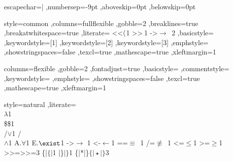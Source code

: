 


  {escapechar=|
  ,numbersep=-9pt %
  ,aboveskip=0pt
  ,belowskip=0pt
  }

  {style=common
  ,columns=fullflexible
  ,gobble=2
  ,breaklines=true
  ,breakatwhitespace=true
  ,literate=
    {<<}{{$\langle$}}1
    {>>}{{$\>$}}1
    {->}{{$\to$\ }}2
  ,basicstyle={\sffamily}
  ,keywordstyle=[1]{\bfseries}
  ,keywordstyle=[2]{\scshape}
  ,keywordstyle=[3]{}
  ,emphstyle={\itshape}
  ,showstringspaces=false
  ,texcl=true
  ,mathescape=true
  ,xleftmargin=1\parindent
  }

  {columns=flexible
  ,gobble=2
  ,fontadjust=true
  ,basicstyle={\ttfamily\small}
  ,commentstyle={\itshape}
  ,keywordstyle={\bfseries}
  ,emphstyle={\itshape}
  ,showstringspaces=false
  ,texcl=true
  ,mathescape=true
  ,xleftmargin=1\parindent
  }

  {style=natural
  ,literate=
    {\\}{{$\lambda$}}1
    {\\\$}{{\$}}1 %
    {\\/}{{$\vee$}}1
    {/\\}{{$\wedge$}}1
    {A.}{{$\forall$}}1
    {E.}{{$\exist$}}1
    {->}{{$\rightarrow$ }}1
    {<-}{{$\leftarrow$}}1
    {==}{{$\equiv$\ }}1
    {/=}{{$\nequiv$\ }}1
    {<=}{{$\leq$}}1
    {>=}{{$\geq$}}1
    {>>=}{{>>=}}3 %
    {\{|}{{$\{\!|\!$}}1
    {|\}}{{$\!|\!\}$}}1
    {\{|*|\}}{{$\{\!|\!\!\star\!\!|\!\}$}}3
  }




